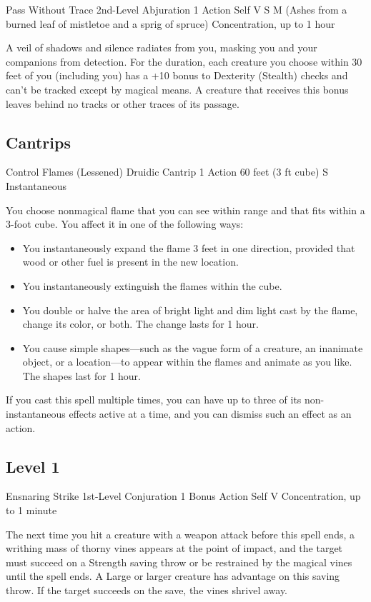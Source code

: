 \documentclass[letterpaper,openany,oneside,twocolumn]{book}
\begin{document}
\DndSpellHeader
  {Pass Without Trace}
  {2nd-Level Abjuration}
  {1 Action}
  {Self}
  {V S M (Ashes from a burned leaf of mistletoe and a sprig of spruce)}
  {Concentration, up to 1 hour}

A veil of shadows and silence radiates from you, masking you and your companions from detection. For the duration, each creature you choose within 30 feet of you (including you) has a +10 bonus to Dexterity (Stealth) checks and can't be tracked except by magical means. A creature that receives this bonus leaves behind no tracks or other traces of its passage.

\subsection*{Cantrips}

\DndSpellHeader
  {Control Flames (Lessened)}
  {Druidic Cantrip}
  {1 Action}
  {60 feet (3 ft cube)}
  {S}
  {Instantaneous}

You choose nonmagical flame that you can see within range and that fits within a 3-foot cube. You affect it in one of the following ways:
\begin{itemize}
	\item You instantaneously expand the flame 3 feet in one direction, provided that wood or other fuel is present in the new location.
	\item You instantaneously extinguish the flames within the cube.
	\item You double or halve the area of bright light and dim light cast by the flame, change its color, or both. The change lasts for 1 hour.
	\item You cause simple shapes—such as the vague form of a creature, an inanimate object, or a location—to appear within the flames and animate as you like. The shapes last for 1 hour.
\end{itemize}
If you cast this spell multiple times, you can have up to three of its non-instantaneous effects active at a time, and you can dismiss such an effect as an action.


\subsection*{Level 1}

\DndSpellHeader
  {Ensnaring Strike}
  {1st-Level Conjuration}
  {1 Bonus Action}
  {Self}
  {V}
  {Concentration, up to 1 minute}

The next time you hit a creature with a weapon attack before this spell ends, a writhing mass of thorny vines appears at the point of impact, and the target must succeed on a Strength saving throw or be restrained by the magical vines until the spell ends. A Large or larger creature has advantage on this saving throw. If the target succeeds on the save, the vines shrivel away.
\end{document}
